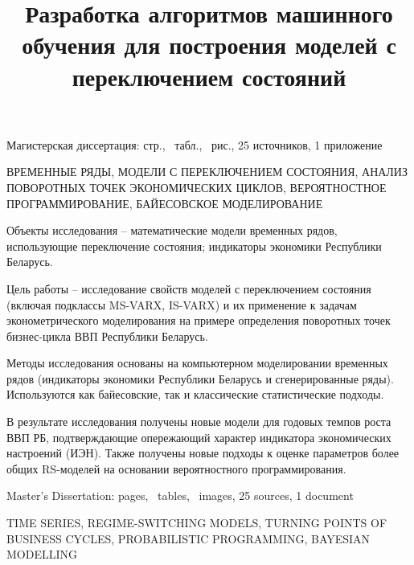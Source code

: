 \documentclass[a4paper,14pt]{extreport}
\title{Разработка алгоритмов машинного обучения для построения моделей с переключением состояний}
\author{\@authorlast \@authorfirst}
\begin{document}
\maketitle




Магистерская диссертация: \pageref{LastPage} стр., \totaltables\ табл., \totalfigures\ рис., 25 источников, 1 приложение

\MakeUppercase{временные ряды, модели с переключением состояния, анализ поворотных точек экономических циклов, вероятностное программирование, байесовское моделирование}

Объекты исследования -- математические модели временных рядов, использующие переключение состояния; индикаторы экономики Республики Беларусь.

Цель работы -- исследование свойств моделей с переключением состояния (включая подклассы MS-VARX, IS-VARX) и их применение к задачам эконометрического моделирования на примере определения поворотных точек бизнес-цикла ВВП Республики Беларусь.

Методы исследования основаны на компьютерном моделировании временных рядов (индикаторы экономики Республики Беларусь и сгенерированные ряды). Используются как байесовские, так и классические статистические подходы.

В результате исследования получены новые модели для годовых темпов роста ВВП РБ, подтверждающие опережающий характер индикатора экономических настроений (ИЭН). Также получены новые подходы к оценке параметров более общих RS-моделей на основании вероятностного программирования.



Master's Dissertation: \pageref{LastPage} pages, \totaltables\ tables, \totalfigures\ images, 25 sources, 1 document

\MakeUppercase{time series, regime-switching models, turning points of business cycles, probabilistic programming, Bayesian modelling}
\end{document}
